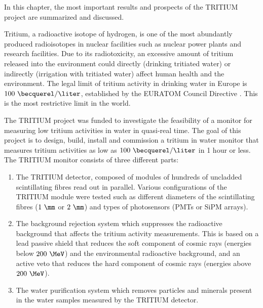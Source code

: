 In this chapter, the most important results and prospects of the TRITIUM project are summarized and discussed. 

Tritium, a radioactive isotope of hydrogen, is one of the most abundantly produced radioisotopes in nuclear facilities such as nuclear power plants and research facilities. Due to its radiotoxicity, an excessive amount of tritium released into the environment could directly (drinking tritiated water) or indirectly (irrigation with tritiated water) affect human health and the environment. The legal limit of tritium activity in drinking water in Europe is $100~\becquerel/\liter$, established by the EURATOM Council Directive \cite{EURATOM_GL}. This is the most restrictive limit in the world. %

The TRITIUM project was funded to investigate the feasibility of a monitor 
for measuring low tritium activities in water in quasi-real time. The goal of this project is to design, build, install and commission a tritium in water monitor that measures tritium activities as low as $100~\becquerel/\liter$ in 1 hour or less. The TRITIUM monitor consists of three different parts:

\begin{enumerate}

\item{} The TRITIUM detector, composed of modules of hundreds of uncladded scintillating fibres read out in parallel. Various configurations of the TRITIUM module were tested such as different diameters of the scintillating fibres ($1~\mm$ or $2~\mm$) and types of photosensors (PMTs or SiPM arrays).

\item{} The background rejection system which suppresses the radioactive background that affects the tritium activity measurements. This is based on a lead passive shield that reduces the soft component of cosmic rays (energies below $200~\MeV$) and the environmental radioactive background, and an active veto that reduces the hard component of cosmic rays (energies above $200~\MeV$).

\item{} The water purification system which removes particles and minerals present in the water samples measured by the TRITIUM detector.

\end{enumerate} 

